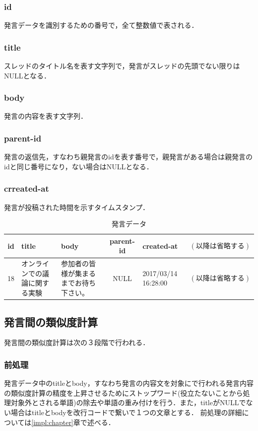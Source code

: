 \subsubsection*{ id}
発言データを識別するための番号で，全て整数値で表される．
\subsubsection*{ title}
スレッドのタイトル名を表す文字列で，発言がスレッドの先頭でない限りはNULLとなる．
\subsubsection*{ body}
発言の内容を表す文字列．
\subsubsection*{ parent-id}
発言の返信先，すなわち親発言のidを表す番号で，親発言がある場合は親発言のidと同じ番号になり，ない場合はNULLとなる．
\subsubsection*{ crreated-at}
発言が投稿された時間を示すタイムスタンプ．

\begin{table}[htbp]
  \begin{tabular}{| c | p{4cm} | p{4cm} | c | p{2cm} | c |} \hline
     id & title & body & parent-id & created-at & $(以降は省略する)$ \\ \hline
     18 & オンラインでの議論に関する実験 &  参加者の皆様が集まるまでお待ち下さい。 & NULL & 2017/03/14 16:28:00 & $(以降は省略する)$ \\
     \hline
  \end{tabular}
  \caption{発言データ} \label{table:remarkData}
\end{table}

\subsection{発言間の類似度計算}
\label{model:simRemarkl}
発言間の類似度計算は次の３段階で行われる．
\subsubsection*{ 前処理}
発言データ中のtitleとbody，すなわち発言の内容文を対象にで行われる発言内容の類似度計算の精度を上昇させるためにストップワード(役立たないことから処理対象外とされる単語)の除去や単語の重み付けを行う．また，titleがNULLでない場合はtitleとbodyを改行コードで繋いで１つの文章とする．
前処理の詳細については\ref{impl:chapter}章で述べる．
